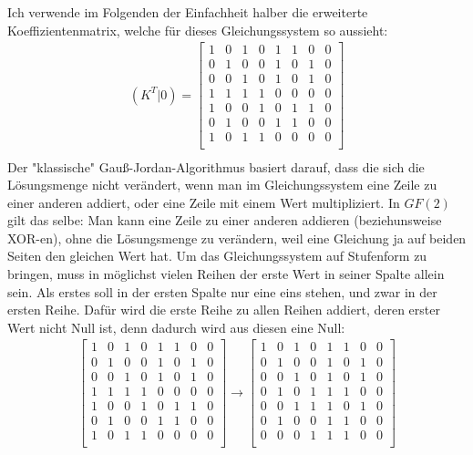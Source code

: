 \documentclass[a4paper,10pt,ngerman]{scrartcl}
\begin{document}
Ich verwende im Folgenden der Einfachheit halber die erweiterte Koeffizientenmatrix, welche für dieses Gleichungssystem so aussieht:
\begin{align*}
(K^T|0)=\left[\begin{array}{ccccccc|c}
1&0&1&0&1&1&0&0\\
0&1&0&0&1&0&1&0\\
0&0&1&0&1&0&1&0\\
1&1&1&1&0&0&0&0\\
1&0&0&1&0&1&1&0\\
0&1&0&0&1&1&0&0\\
1&0&1&1&0&0&0&0\\
\end{array}\right]\\
\end{align*}
Der "klassische" Gauß-Jordan-Algorithmus basiert darauf, dass die sich die Lösungsmenge nicht verändert, wenn man im Gleichungssystem eine Zeile zu einer anderen addiert, oder eine Zeile mit einem Wert multipliziert. In $GF(2)$ gilt das selbe: Man kann eine Zeile zu einer anderen addieren (beziehunsweise XOR-en), ohne die Lösungsmenge zu verändern, weil eine Gleichung ja auf beiden Seiten den gleichen Wert hat. Um das Gleichungssystem auf Stufenform zu bringen, muss in möglichst vielen Reihen der erste Wert in seiner Spalte allein sein. Als erstes soll in der ersten Spalte nur eine eins stehen, und zwar in der ersten Reihe. Dafür wird die erste Reihe zu allen Reihen addiert, deren erster Wert nicht Null ist, denn dadurch wird aus diesen eine Null:
\begin{align*}
\left[\begin{array}{ccccccc|c}
1&0&1&0&1&1&0&0\\
0&1&0&0&1&0&1&0\\
0&0&1&0&1&0&1&0\\
1&1&1&1&0&0&0&0\\
1&0&0&1&0&1&1&0\\
0&1&0&0&1&1&0&0\\
1&0&1&1&0&0&0&0\\
\end{array}\right]
\rightarrow\left[\begin{array}{ccccccc|c}
1&0&1&0&1&1&0&0\\
0&1&0&0&1&0&1&0\\
0&0&1&0&1&0&1&0\\
0&1&0&1&1&1&0&0\\
0&0&1&1&1&0&1&0\\
0&1&0&0&1&1&0&0\\
0&0&0&1&1&1&0&0\\
\end{array}\right]\\
\end{align*}
\end{document}

